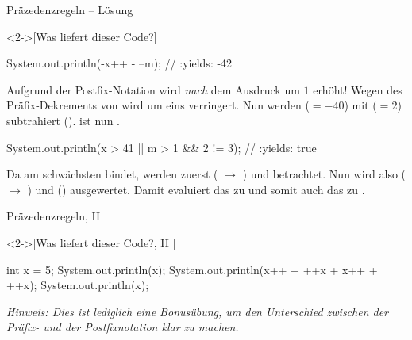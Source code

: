 \ifull
\begin{frame}[fragile,c]{Präzedenzregeln -- Lösung}
    \begin{solve}<2->[Was liefert dieser Code?]
        \pause{}\begin{plainjava}[columns={[c]fullflexible}]
System.out.println(-x++ - --m); // :yields: -42
        \end{plainjava}
        \pause{}Aufgrund der Postfix-Notation  wird  \emph{nach} dem Ausdruck um \(1\) erhöht!\pause{} Wegen des Präfix-Dekrements von  wird  um eins verringert.\pause{} Nun werden  (\(=-40\)) mit  (\(= 2\)) subtrahiert ().\pause{}  ist nun .
        \begin{plainjava}[columns={[c]fullflexible}]
System.out.println(x > 41 || m > 1 && 2 != 3); // :yields: true
        \end{plainjava}
        Da \bjava{||} am schwächsten bindet,\pause{} werden zuerst  ( \(\to\) ) und  betrachtet.\pause{} Nun wird also  ( \(\to\) ) und  () ausgewertet.\pause{} Damit evaluiert das  zu  und somit auch das  zu .
    \end{solve}
\end{frame}

\begin{frame}[fragile,c]{Präzedenzregeln, II}
\begin{exercise}<2->[Was liefert dieser Code?, II ]
    \begin{plainjava}[columns={[c]fullflexible}]
int x = 5;
System.out.println(x);
System.out.println(x++ + ++x + x++ + ++x);
System.out.println(x);
    \end{plainjava}
    \pause{}\textit{Hinweis: Dies ist lediglich eine Bonusübung, um den Unterschied zwischen der Präfix- und der Postfixnotation klar zu machen.}
\end{exercise}
\end{frame}

